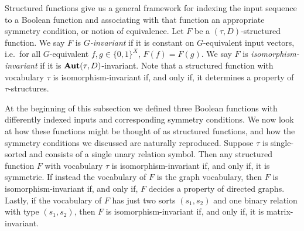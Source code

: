 \documentclass[../paper.tex]{subfiles}
\begin{document}

Structured functions give us a general framework for indexing the input sequence
to a Boolean function and associating with that function an appropriate symmetry
condition, or notion of equivalence. Let $F$ be a $(\tau, D)$-structured
function. We say $F$ is \emph{$G$-invariant} if it is constant on $G$-equivalent
input vectors, i.e.\ for all $G$-equivalent $f, g \in \{0,1\}^{X}$, $F(f) =
F(g)$. We say $F$ is \emph{isomorphism-invariant} if it is $\text{\textbf{Aut}}(\tau,
D)$-invariant. Note that a structured function with vocabulary $\tau$ is
isomorphism-invariant if, and only if, it determines a property of
$\tau$-structures.

At the beginning of this subsection we defined three Boolean functions with
differently indexed inputs and corresponding symmetry conditions. We now look at
how these functions might be thought of as structured functions, and how the
symmetry conditions we discussed are naturally reproduced. Suppose $\tau$ is
single-sorted and consists of a single unary relation symbol. Then any
structured function $F$ with vocabulary $\tau$ is isomorphism-invariant if, and
only if, it is symmetric. If instead the vocabulary of $F$ is the graph
vocabulary, then $F$ is isomorphism-invariant if, and only if, $F$ decides a
property of directed graphs. Lastly, if the vocabulary of $F$ has just two sorts
$(s_1, s_2)$ and one binary relation with type $(s_1, s_2)$, then $F$ is
isomorphism-invariant if, and only if, it is matrix-invariant.
\end{document}
